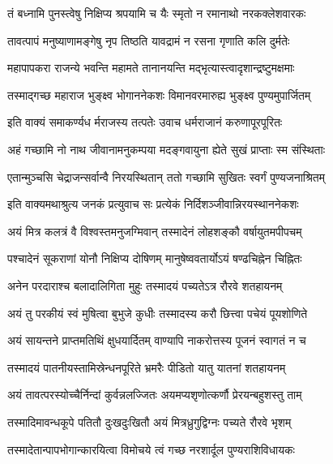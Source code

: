 \twolineshloka
{तं बध्नामि पुनस्त्वेषु निक्षिप्य श्रपयामि च}
{यैः स्मृतो न रमानाथो नरकक्लेशवारकः}%

\twolineshloka
{तावत्पापं मनुष्याणामङ्गेषु नृप तिष्ठति}
{यावद्रामं न रसना गृणाति कलि दुर्मतेः}%

\twolineshloka
{महापापकरा राजन्ये भवन्ति महामते}
{तानानयन्ति मद्भृत्यास्त्वादृशान्द्रष्टुमक्षमाः}%

\twolineshloka
{तस्माद्गच्छ महाराज भुङ्क्ष्व भोगाननेकशः}
{विमानवरमारुह्य भुङ्क्ष्व पुण्यमुपार्जितम्}%

\twolineshloka
{इति वाक्यं समाकर्ण्यध र्मराजस्य तत्पतेः}
{उवाच धर्मराजानं करुणापूरपूरितः}%


\twolineshloka
{अहं गच्छामि नो नाथ जीवानामनुकम्पया}
{मदङ्गवायुना ह्येते सुखं प्राप्ताः स्म संस्थिताः}%

\twolineshloka
{एतान्मुञ्चसि चेद्राजन्सर्वान्वै निरयस्थितान्}
{ततो गच्छामि सुखितः स्वर्गं पुण्यजनाश्रितम्}%


\twolineshloka
{इति वाक्यमथाश्रुत्य जनकं प्रत्युवाच सः}
{प्रत्येकं निर्दिशञ्जीवान्निरयस्थाननेकशः}%


\twolineshloka
{अयं मित्र कलत्रं वै विश्वस्तमनुजग्मिवान्}
{तस्मादेनं लोहशङ्कौ वर्षायुतमपीपचम्}%

\twolineshloka
{पश्चादेनं सूकराणां योनौ निक्षिप्य दोषिणम्}
{मानुषेष्ववतार्योऽयं षण्ढचिह्नेन चिह्नितः}%

\twolineshloka
{अनेन परदाराश्च बलादालिगिता मुहुः}
{तस्मादयं पच्यतेऽत्र रौरवे शतहायनम्}%

\twolineshloka
{अयं तु परकीयं स्वं मुषित्वा बुभुजे कुधीः}
{तस्मादस्य करौ छित्त्वा पचेयं पूयशोणिते}%

\twolineshloka
{अयं सायन्तने प्राप्तमतिथिं क्षुधयार्दितम्}
{वाण्यापि नाकरोत्तस्य पूजनं स्वागतं न च}%

\twolineshloka
{तस्मादयं पातनीयस्तामिस्रेन्धनपूरिते}
{भ्रमरैः पीडितो यातु यातनां शतहायनम्}%

\twolineshloka
{अयं तावत्परस्योच्चैर्निन्दां कुर्वन्नलज्जितः}
{अयमप्यशृणोत्कर्णौ प्रेरयन्बहुशस्तु ताम्}%

\twolineshloka
{तस्मादिमावन्धकूपे पतितौ दुःखदुःखितौ}
{अयं मित्रध्रुगुद्विग्नः पच्यते रौरवे भृशम्}%

\twolineshloka
{तस्मादेतान्पापभोगान्कारयित्वा विमोचये}
{त्वं गच्छ नरशार्दूल पुण्यराशिविधायकः}%

